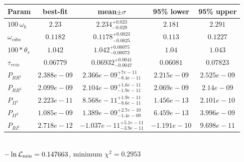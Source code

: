 \begin{tabular}{|l|c|c|c|c|} 
 \hline 
Param & best-fit & mean$\pm\sigma$ & 95\% lower & 95\% upper \\ \hline 
$100~\omega_{b }$ &$2.23$ & $2.234_{-0.029}^{+0.023}$ & $2.181$ & $2.291$ \\ 
$\omega_{cdm }$ &$0.1182$ & $0.1178_{-0.0025}^{+0.0023}$ & $0.113$ & $0.1227$ \\ 
$100*\theta_{s }$ &$1.042$ & $1.042_{-0.00073}^{+0.00075}$ & $1.04$ & $1.043$ \\ 
$\tau_{reio }$ &$0.06779$ & $0.06932_{-0.0047}^{+0.0041}$ & $0.06081$ & $0.07823$ \\ 
$P_{{RR}^1 }$ &$2.388e-09$ & $2.366e-09_{-8.4e-11}^{+7e-11}$ & $2.215e-09$ & $2.525e-09$ \\ 
$P_{{RR}^2 }$ &$2.099e-09$ & $2.104e-09_{-1.9e-11}^{+1.6e-11}$ & $2.069e-09$ & $2.14e-09$ \\ 
$P_{{II}^1 }$ &$2.223e-11$ & $8.568e-11_{-8.6e-11}^{+1.9e-11}$ & $1.456e-13$ & $2.101e-10$ \\ 
$P_{{II}^2 }$ &$1.085e-09$ & $1.389e-09_{-1.4e-09}^{+2.7e-10}$ & $6.459e-13$ & $3.996e-09$ \\ 
$P_{{RI}^1 }$ &$2.718e-12$ & $-1.037e-11_{-3.9e-11}^{+5.1e-11}$ & $-1.191e-10$ & $9.698e-11$ \\ 
\hline 
 \end{tabular} \\ 
$-\ln{\cal L}_\mathrm{min} =0.147663$, minimum $\chi^2=0.2953$ \\ 
